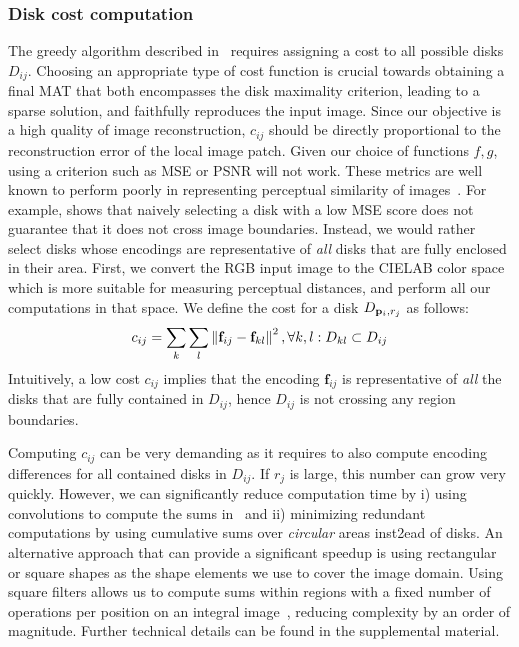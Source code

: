 \documentclass[10pt,twocolumn,letterpaper]{article}
\begin{document}
\subsubsection*{Disk cost computation}
The greedy algorithm described in~ requires assigning a cost to all possible disks $D_{ij}$.
Choosing an appropriate type of cost function is crucial towards obtaining a final MAT that both encompasses the 
disk maximality criterion, leading to a sparse solution, and faithfully reproduces the input image.
Since our objective is a high quality of image reconstruction, $c_{ij}$ should be directly proportional
to the reconstruction error of the local image patch.
Given our choice of functions $f,g$, using a criterion such as MSE or PSNR will not work.
These metrics are well known to perform poorly in representing perceptual similarity of images~\cite{girod1993what,wang2009mean}.
For example,  shows that naively selecting a disk with a low MSE score does not guarantee that it 
does not cross image boundaries.
Instead, we would rather select disks whose encodings are representative of \emph{all} disks that are fully enclosed
in their area. 
First, we convert the RGB input image to the CIELAB color space which is more suitable for measuring perceptual distances,
and perform all our computations in that space.
We define the cost for a disk $D_{\mathbf{p}_{i},r_j}$ as follows:
\begin{equation}
c_{ij} = \sum_k \sum_l \left \lVert \mathbf{f}_{ij} - \mathbf{f}_{kl}  \right \rVert^2, \forall k,l: D_{kl} \subset D_{ij}
\label{eq:diskcost}
\end{equation}
Intuitively, a low cost $c_{ij}$ implies that the encoding $\mathbf{f}_{ij}$ is representative of \emph{all}
the disks that are fully contained in $D_{ij}$, hence $D_{ij}$ is not crossing any region boundaries.

Computing $c_{ij}$ can be very demanding as it requires to also compute encoding differences for all
contained disks in $D_{ij}$. If $r_j$ is large, this number can grow very quickly.
However, we can significantly reduce computation time by i) using convolutions to compute the sums in~
and ii) minimizing redundant computations by using cumulative sums over \emph{circular} areas inst2ead of disks.
An alternative approach that can provide a significant speedup is using rectangular or square shapes as the
shape elements we use to cover the image domain.
Using square filters allows us to compute sums within regions with a fixed number of operations per position on an integral
image~\cite{viola2001rapid,arbelaez2011contour}, reducing complexity by an order of magnitude.
Further technical details can be found in the supplemental material.
\end{document}
